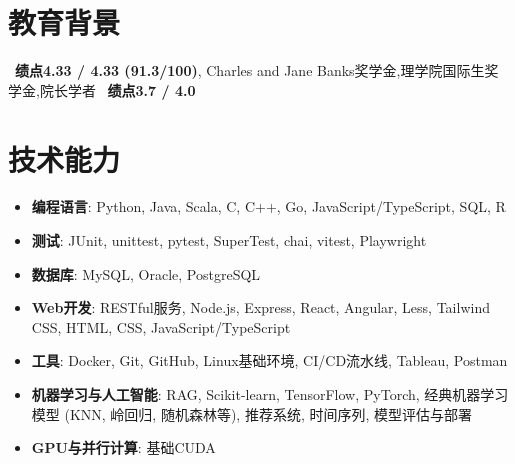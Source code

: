 \documentclass{resume}
\begin{document}




\section{教育背景}
\ \textbf{绩点4.33 / 4.33 (91.3/100)}, Charles and Jane Banks奖学金,理学院国际生奖学金,院长学者
\ \textbf{绩点3.7 / 4.0}

\section{技术能力}
\begin{itemize}[parsep=0.2ex]
  \item \textbf{编程语言}: Python, Java, Scala, C, C++, Go, JavaScript/TypeScript, SQL, R
  \item \textbf{测试}: JUnit, unittest, pytest, SuperTest, chai, vitest, Playwright
  \item \textbf{数据库}: MySQL, Oracle, PostgreSQL
  \item \textbf{Web开发}: RESTful服务, Node.js, Express, React, Angular, Less, Tailwind CSS, HTML, CSS, JavaScript/TypeScript
  \item \textbf{工具}: Docker, Git, GitHub, Linux基础环境, CI/CD流水线, Tableau, Postman
  \item \textbf{机器学习与人工智能}: RAG, Scikit-learn, TensorFlow, PyTorch, 经典机器学习模型 (KNN, 岭回归, 随机森林等), 推荐系统, 时间序列, 模型评估与部署
  \item \textbf{GPU与并行计算}: 基础CUDA
\end{itemize}
\end{document}
